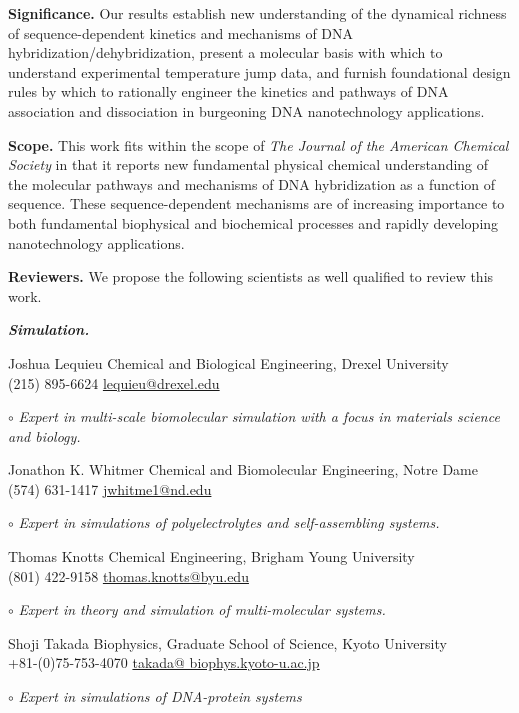 \documentclass[11pt,a4paper]{letter} %
\begin{document}
\begin{letter}
\textbf{Significance.} Our results establish new understanding of the dynamical richness of sequence-dependent kinetics and mechanisms of DNA hybridization/dehybridization, present a molecular basis with which to understand experimental temperature jump data, and furnish foundational design rules by which to rationally engineer the kinetics and pathways of DNA association and dissociation in burgeoning DNA nanotechnology applications.

\textbf{Scope.}  This work fits within the scope of \textit{The Journal of the American Chemical Society} in that it reports new fundamental physical chemical understanding of the molecular pathways and mechanisms of DNA hybridization as a function of sequence. These sequence-dependent mechanisms are of increasing importance to both fundamental biophysical and biochemical processes and rapidly developing nanotechnology applications.


\textbf{Reviewers.} We propose the following scientists as well qualified to review this work.

\textbf{\textit{Simulation.}} 


Joshua Lequieu \hfill Chemical and Biological Engineering, Drexel University \\
(215) 895-6624 \hfill \url{lequieu@drexel.edu}

$\circ$ \textit{Expert in multi-scale biomolecular simulation with a focus in materials science and biology. }

Jonathon K. Whitmer \hfill Chemical and Biomolecular Engineering, Notre Dame \\
(574) 631-1417 \hfill \url{jwhitme1@nd.edu}

$\circ$ \textit{Expert in simulations of polyelectrolytes and self-assembling systems.  }

Thomas Knotts \hfill Chemical Engineering, Brigham Young University \\
(801) 422-9158 \hfill \url{thomas.knotts@byu.edu}

$\circ$ \textit{Expert in theory and simulation of multi-molecular systems.  }

Shoji Takada \hfill Biophysics, Graduate School of Science, Kyoto University \\
+81-(0)75-753-4070 \hfill \url{takada@ biophys.kyoto-u.ac.jp}

$\circ$ \textit{Expert in simulations of DNA-protein systems }


\end{letter}
\end{document}

